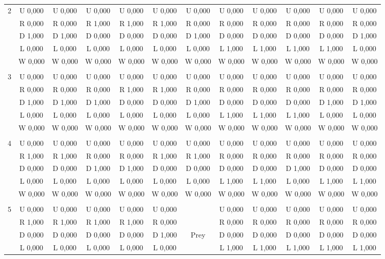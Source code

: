 \begin{table}[htbp]
\begin{footnotesize}
\begin{tabular}{c|c|c|c|c|c|c|c|c|c|c|c|}
2&U 0,000&U 0,000&U 0,000&U 0,000&U 0,000&U 0,000&U 0,000&U 0,000&U 0,000&U 0,000&U 0,000\\
&R 0,000&R 0,000&R 1,000&R 1,000&R 1,000&R 0,000&R 0,000&R 0,000&R 0,000&R 0,000&R 0,000\\
&D 1,000&D 1,000&D 0,000&D 0,000&D 0,000&D 1,000&D 0,000&D 0,000&D 0,000&D 0,000&D 1,000\\
&L 0,000&L 0,000&L 0,000&L 0,000&L 0,000&L 0,000&L 1,000&L 1,000&L 1,000&L 1,000&L 0,000\\
&W 0,000&W 0,000&W 0,000&W 0,000&W 0,000&W 0,000&W 0,000&W 0,000&W 0,000&W 0,000&W 0,000\\
\hline \\
3&U 0,000&U 0,000&U 0,000&U 0,000&U 0,000&U 0,000&U 0,000&U 0,000&U 0,000&U 0,000&U 0,000\\
&R 0,000&R 0,000&R 0,000&R 1,000&R 1,000&R 0,000&R 0,000&R 0,000&R 0,000&R 0,000&R 0,000\\
&D 1,000&D 1,000&D 1,000&D 0,000&D 0,000&D 1,000&D 0,000&D 0,000&D 0,000&D 1,000&D 1,000\\
&L 0,000&L 0,000&L 0,000&L 0,000&L 0,000&L 0,000&L 1,000&L 1,000&L 1,000&L 0,000&L 0,000\\
&W 0,000&W 0,000&W 0,000&W 0,000&W 0,000&W 0,000&W 0,000&W 0,000&W 0,000&W 0,000&W 0,000\\
\hline \\
4&U 0,000&U 0,000&U 0,000&U 0,000&U 0,000&U 0,000&U 0,000&U 0,000&U 0,000&U 0,000&U 0,000\\
&R 1,000&R 1,000&R 0,000&R 0,000&R 1,000&R 1,000&R 0,000&R 0,000&R 0,000&R 0,000&R 0,000\\
&D 0,000&D 0,000&D 1,000&D 1,000&D 0,000&D 0,000&D 0,000&D 0,000&D 1,000&D 0,000&D 0,000\\
&L 0,000&L 0,000&L 0,000&L 0,000&L 0,000&L 0,000&L 1,000&L 1,000&L 0,000&L 1,000&L 1,000\\
&W 0,000&W 0,000&W 0,000&W 0,000&W 0,000&W 0,000&W 0,000&W 0,000&W 0,000&W 0,000&W 0,000\\
\hline \\
5&U 0,000&U 0,000&U 0,000&U 0,000&U 0,000&&U 0,000&U 0,000&U 0,000&U 0,000&U 0,000\\
&R 1,000&R 1,000&R 1,000&R 1,000&R 0,000&&R 0,000&R 0,000&R 0,000&R 0,000&R 0,000\\
&D 0,000&D 0,000&D 0,000&D 0,000&D 1,000&Prey&D 0,000&D 0,000&D 0,000&D 0,000&D 0,000\\
&L 0,000&L 0,000&L 0,000&L 0,000&L 0,000&&L 1,000&L 1,000&L 1,000&L 1,000&L 1,000\\

\end{tabular}
\end{footnotesize}
\end{table}
